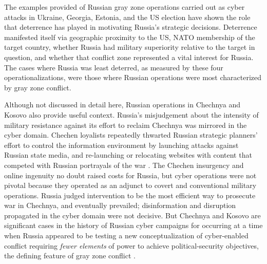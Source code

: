 \documentclass[12pt,letterpaper]{article}
\begin{document}
	The examples provided of Russian gray zone operations carried out as cyber attacks in Ukraine, Georgia, Estonia, and the US election have shown the role that deterrence has played in motivating Russia's strategic decisions. Deterrence manifested itself via geographic proximity to the US, NATO membership of the target country, whether Russia had military superiority relative to the target in question, and whether that conflict zone represented a vital interest for Russia. The cases where Russia was least deterred, as measured by these four operationalizations, were those where Russian operations were most characterized by gray zone conflict.

	Although not discussed in detail here, Russian operations in Chechnya and Kosovo also provide useful context. Russia’s misjudgement about the intensity of military resistance against its effort to reclaim Chechnya was mirrored in the cyber domain. Chechen loyalists repeatedly thwarted Russian strategic planners’ effort to control the information environment by launching attacks against Russian state media, and re-launching or relocating websites with content that competed with Russian portrayals of the war \citep{bullough_russianswagecyber_2002}. The Chechen insurgency and online ingenuity no doubt raised costs for Russia, but cyber operations were not pivotal because they operated as an adjunct to covert and conventional military operations. Russia judged intervention to be the most efficient way to prosecute war in Chechnya, and eventually prevailed; disinformation and disruption propagated in the cyber domain were not decisive. But Chechnya and Kosovo are significant cases in the history of Russian cyber campaigns for occurring at a time when Russia appeared to be testing a new conceptualization of cyber-enabled conflict requiring \textit{fewer elements} of power to achieve political-security objectives, the defining feature of gray zone conflict \citep{bullough_russianswagecyber_2002}.
		
\end{document}
